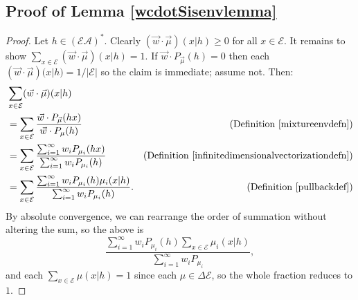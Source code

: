 \documentclass[twoside]{article}
\begin{document}
\subsection{Proof of Lemma \ref{wcdotSisenvlemma}}
\begin{proof}
    Let $h\in(\mathcal E\mathcal A)^*$.
    Clearly $(\vec w\cdot \vec\mu)(x|h)\geq 0$ for all $x\in\mathcal E$.
    It remains to show $\sum_{x\in\mathcal E}(\vec w\cdot \vec\mu)(x|h)=1$.
    If $\vec w\cdot P_{\vec\mu}(h)=0$ then each $(\vec w\cdot \vec\mu)(x|h)=1/|\mathcal E|$
    so the claim is immediate; assume not. Then:
    \begin{align*}
        &{} \sum_{x\in\mathcal E}(\vec w\cdot \vec\mu)(x|h)\\
            &= \sum_{x\in\mathcal E}\frac{\vec w\cdot P_{\vec\mu}(hx)}{\vec w\cdot P_{\mu}(h)}
                &\mbox{(Definition \ref{mixtureenvdefn})}\\
            &= \sum_{x\in\mathcal E}
                \frac{
                    \sum_{i=1}^\infty w_i P_{\mu_i}(hx)
                }{
                    \sum_{i=1}^\infty w_i P_{\mu_i}(h)
                }
                &\mbox{(Definition \ref{infinitedimensionalvectorizationdefn})}\\
            &= \sum_{x\in\mathcal E}
                \frac{
                    \sum_{i=1}^\infty w_i P_{\mu_i}(h)\mu_i(x|h)
                }{
                    \sum_{i=1}^\infty w_i P_{\mu_i}(h)
                }.
                &\mbox{(Definition \ref{pullbackdef})}
    \end{align*}
    By absolute convergence, we can rearrange the order of summation without
    altering the sum, so the above is
    \[
        \frac{
            \sum_{i=1}^\infty w_i P_{\mu_i}(h)\sum_{x\in\mathcal E}\mu_i(x|h)
        }{
            \sum_{i=1}^\infty w_i P_{\mu_i}
        },
    \]
    and each $\sum_{x\in\mathcal E}\mu(x|h)=1$ since each $\mu\in\Delta\mathcal E$,
    so the whole fraction reduces to $1$.
\end{proof}
\end{document}

